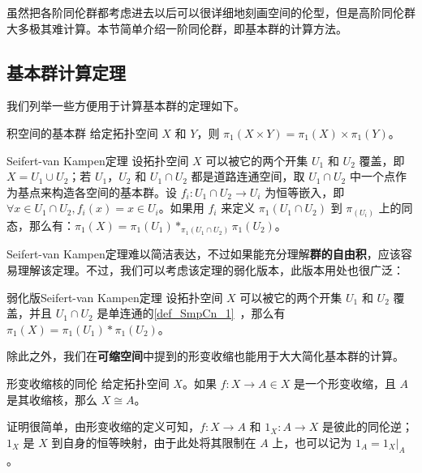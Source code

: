 

虽然把各阶同伦群都考虑进去以后可以很详细地刻画空间的伦型，但是高阶同伦群大多极其难计算。本节简单介绍一阶同伦群，即基本群的计算方法。

\subsection{基本群计算定理}

我们列举一些方便用于计算基本群的定理如下。

\begin{theorem}{积空间的基本群}
给定拓扑空间 $X$ 和 $Y$，则 $\pi_1(X\times Y)=\pi_1(X)\times\pi_1(Y)$。
\end{theorem}

\begin{theorem}{Seifert-van Kampen定理}
设拓扑空间 $X$ 可以被它的两个开集 $U_1$ 和 $U_2$ 覆盖，即 $X=U_1\cup U_2$；若 $U_1$，$U_2$ 和 $U_1\cap U_2$ 都是道路连通空间，取 $U_1\cap U_2$ 中一个点作为基点来构造各空间的基本群。设 $f_i:U_1\cap U_2\rightarrow U_i$ 为恒等嵌入，即 $\forall x\in U_1\cap U_2, f_i(x)=x\in U_i$。如果用 $f_i$ 来定义 $\pi_1(U_1\cap U_2)$ 到 $\pi_(U_i)$ 上的同态，那么有：$\pi_1(X)=\pi_1(U_1)*_{\pi_1(U_1\cap U_2)}\pi_1(U_2)$。
\end{theorem}

Seifert-van Kampen定理难以简洁表达，不过如果能充分理解\textbf{群的自由积}，应该容易理解该定理。不过，我们可以考虑该定理的弱化版本，此版本用处也很广泛：

\begin{theorem}{弱化版Seifert-van Kampen定理}
设拓扑空间 $X$ 可以被它的两个开集 $U_1$ 和 $U_2$ 覆盖，并且 $U_1\cap U_2$ 是单连通的\autoref{def_SmpCn_1}~，那么有 $\pi_1(X)=\pi_1(U_1)*\pi_1(U_2)$。
\end{theorem}

除此之外，我们在\textbf{可缩空间}中提到的形变收缩也能用于大大简化基本群的计算。

\begin{theorem}{形变收缩核的同伦}\label{the_HomT5_1}
给定拓扑空间 $X$。如果 $f:X\rightarrow A\in X$ 是一个形变收缩，且 $A$ 是其收缩核，那么 $X\cong A$。
\end{theorem}

证明很简单，由形变收缩的定义可知，$f:X\rightarrow A$ 和 $1_X:A\rightarrow X$ 是彼此的同伦逆；$1_X$ 是 $X$ 到自身的恒等映射，由于此处将其限制在 $A$ 上，也可以记为 $1_A=1_X|_A$。


